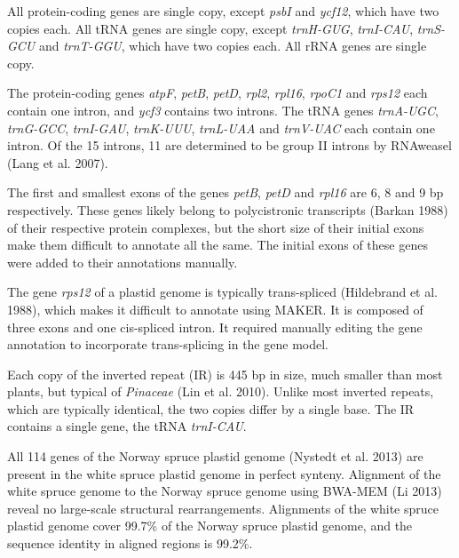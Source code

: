 \documentclass[
  12pt,
  oneside,
  openany]{book}
\begin{document}
All protein-coding genes are single copy, except \emph{psbI} and \emph{ycf12}, which have two copies each. All tRNA genes are single copy, except \emph{trnH-GUG}, \emph{trnI-CAU}, \emph{trnS-GCU} and \emph{trnT-GGU}, which have two copies each. All rRNA genes are single copy.

The protein-coding genes \emph{atpF}, \emph{petB}, \emph{petD}, \emph{rpl2}, \emph{rpl16}, \emph{rpoC1} and \emph{rps12} each contain one intron, and \emph{ycf3} contains two introns. The tRNA genes \emph{trnA-UGC}, \emph{trnG-GCC}, \emph{trnI-GAU}, \emph{trnK-UUU}, \emph{trnL-UAA} and \emph{trnV-UAC} each contain one intron. Of the 15 introns, 11 are determined to be group II introns by RNAweasel (Lang et al. 2007).

The first and smallest exons of the genes \emph{petB}, \emph{petD} and \emph{rpl16} are 6, 8 and 9 bp respectively. These genes likely belong to polycistronic transcripts (Barkan 1988) of their respective protein complexes, but the short size of their initial exons make them difficult to annotate all the same. The initial exons of these genes were added to their annotations manually.

The gene \emph{rps12} of a plastid genome is typically trans-spliced (Hildebrand et al. 1988), which makes it difficult to annotate using MAKER. It is composed of three exons and one cis-spliced intron. It required manually editing the gene annotation to incorporate trans-splicing in the gene model.

Each copy of the inverted repeat (IR) is 445 bp in size, much smaller than most plants, but typical of \emph{Pinaceae} (Lin et al. 2010). Unlike most inverted repeats, which are typically identical, the two copies differ by a single base. The IR contains a single gene, the tRNA \emph{trnI-CAU}.

All 114 genes of the Norway spruce plastid genome (Nystedt et al. 2013) are present in the white spruce plastid genome in perfect synteny. Alignment of the white spruce genome to the Norway spruce genome using BWA-MEM (Li 2013) reveal no large-scale structural rearrangements. Alignments of the white spruce plastid genome cover 99.7\% of the Norway spruce plastid genome, and the sequence identity in aligned regions is 99.2\%.
\end{document}
